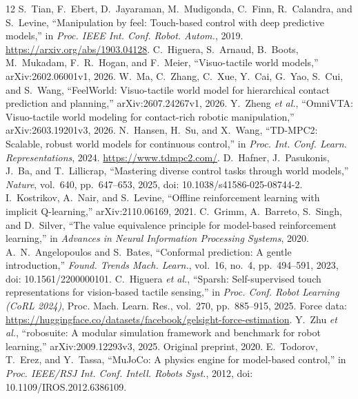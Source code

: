 \documentclass[letterpaper,10pt,conference]{ieeeconf}
\begin{document}
\begin{thebibliography}{12}
S.~Tian, F.~Ebert, D.~Jayaraman, M.~Mudigonda, C.~Finn, R.~Calandra,
and S.~Levine, ``Manipulation by feel: Touch-based control with deep
predictive models,'' in \emph{Proc. IEEE Int. Conf. Robot. Autom.}, 2019.
\url{https://arxiv.org/abs/1903.04128}.
C.~Higuera, S.~Arnaud, B.~Boots, M.~Mukadam, F.~R.~Hogan, and F.~Meier,
``Visuo-tactile world models,'' arXiv:2602.06001v1, 2026.
W.~Ma, C.~Zhang, C.~Xue, Y.~Cai, G.~Yao, S.~Cui, and S.~Wang,
``FeelWorld: Visuo-tactile world model for hierarchical contact prediction
and planning,'' arXiv:2607.24267v1, 2026.
Y.~Zheng \emph{et al.}, ``OmniVTA: Visuo-tactile world modeling for
contact-rich robotic manipulation,'' arXiv:2603.19201v3, 2026.
N.~Hansen, H.~Su, and X.~Wang, ``TD-MPC2: Scalable, robust world models
for continuous control,'' in \emph{Proc. Int. Conf. Learn. Representations},
2024. \url{https://www.tdmpc2.com/}.
D.~Hafner, J.~Pasukonis, J.~Ba, and T.~Lillicrap, ``Mastering diverse
control tasks through world models,'' \emph{Nature}, vol.~640,
pp.~647--653, 2025, doi: 10.1038/s41586-025-08744-2.
I.~Kostrikov, A.~Nair, and S.~Levine, ``Offline reinforcement learning
with implicit Q-learning,'' arXiv:2110.06169, 2021.
C.~Grimm, A.~Barreto, S.~Singh, and D.~Silver, ``The value equivalence
principle for model-based reinforcement learning,'' in \emph{Advances in
Neural Information Processing Systems}, 2020.
A.~N.~Angelopoulos and S.~Bates, ``Conformal prediction: A gentle
introduction,'' \emph{Found. Trends Mach. Learn.}, vol.~16, no.~4,
pp.~494--591, 2023, doi: 10.1561/2200000101.
C.~Higuera \emph{et al.}, ``Sparsh: Self-supervised touch representations
for vision-based tactile sensing,'' in \emph{Proc. Conf. Robot Learning
(CoRL 2024)}, Proc. Mach. Learn. Res., vol.~270, pp.~885--915, 2025.
Force data: \url{https://huggingface.co/datasets/facebook/gelsight-force-estimation}.
Y.~Zhu \emph{et al.}, ``robosuite: A modular simulation framework and
benchmark for robot learning,'' arXiv:2009.12293v3, 2025. Original preprint, 2020.
E.~Todorov, T.~Erez, and Y.~Tassa, ``MuJoCo: A physics engine for
model-based control,'' in \emph{Proc. IEEE/RSJ Int. Conf. Intell. Robots Syst.},
2012, doi: 10.1109/IROS.2012.6386109.
\end{thebibliography}
\end{document}

